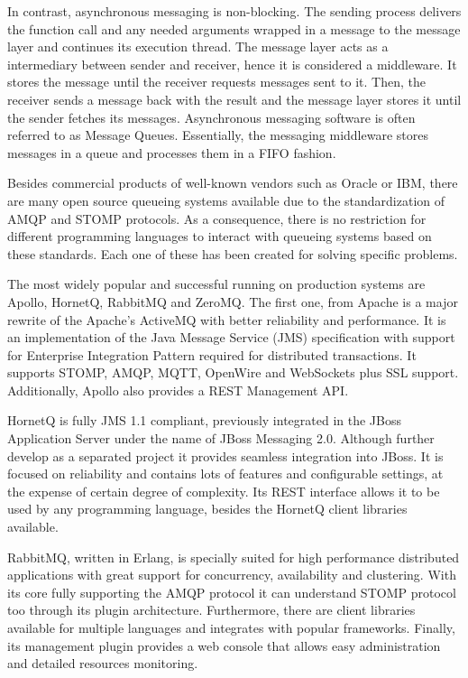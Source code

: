 In contrast, asynchronous messaging is non-blocking. The sending process delivers the function call and any needed arguments wrapped in a message to the message layer and continues its execution thread. The message layer acts as a intermediary between sender and receiver, hence it is considered a middleware. It stores the message until the receiver requests messages sent to it. Then, the receiver sends a message back with the result and the message layer stores it until the sender fetches its messages. Asynchronous messaging software is often referred to as Message Queues. Essentially, the messaging middleware stores messages in a queue and processes them in a FIFO fashion.

Besides commercial products of well-known vendors such as Oracle or IBM, there are many open source queueing systems available \cite{queues.io} due to the standardization of AMQP and STOMP protocols. As a consequence, there is no restriction for different programming languages to interact with queueing systems based on these standards. Each one of these has been created for solving specific problems.

The most widely popular and successful running on production systems are Apollo, HornetQ, RabbitMQ and ZeroMQ. The first one, from Apache is a major rewrite of the Apache's ActiveMQ with better reliability and performance. It is an implementation of the Java Message Service (JMS) specification with support for Enterprise Integration Pattern required for distributed transactions. It supports STOMP, AMQP, MQTT, OpenWire and WebSockets plus SSL support. Additionally, Apollo also provides a REST Management API.

HornetQ is fully JMS 1.1 compliant, previously integrated in the JBoss Application Server under the name of JBoss Messaging 2.0. Although further develop as a separated project it provides seamless integration into JBoss. It is focused on reliability and contains lots of features and configurable settings, at the expense of certain degree of complexity. Its REST interface allows it to be used by any programming language, besides the HornetQ client libraries available.

RabbitMQ, written in Erlang, is specially suited for high performance distributed applications with great support for concurrency, availability and clustering. With its core fully supporting the AMQP protocol it can understand STOMP protocol too through its plugin architecture. Furthermore, there are client libraries available for multiple languages and integrates with popular frameworks. Finally, its management plugin provides a web console that allows easy administration and detailed resources monitoring.

